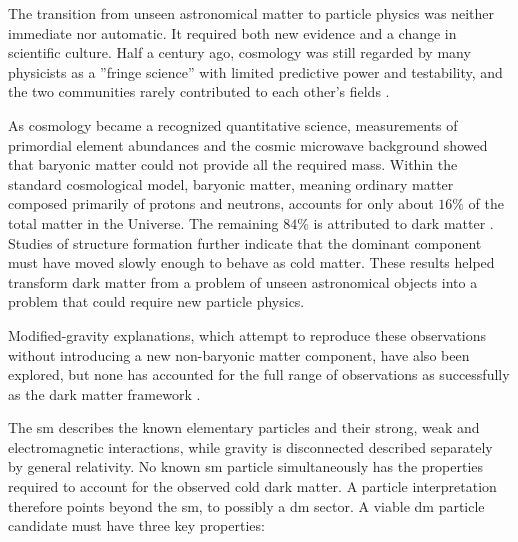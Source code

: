 The transition from unseen astronomical matter to particle physics was neither
immediate nor automatic. It required both new evidence and a change in
scientific culture. Half a century ago, cosmology was still regarded by many physicists as a ''fringe science'' with limited predictive
power and testability, and the two communities rarely contributed to each
other's fields \cite{bertone2016-history-dark-matter}.

As cosmology became a recognized quantitative science, measurements of primordial element
abundances and the cosmic microwave background showed that baryonic
matter could not provide all the required mass. Within the standard
cosmological model, baryonic matter, meaning ordinary matter composed primarily
of protons and neutrons, accounts for only about \(16\%\) of the total matter
in the Universe. The remaining \(84\%\) is attributed to dark matter
\cite{cirelli2026-darkmatter}. Studies of structure formation further indicate
that the dominant component must have moved slowly enough to behave as cold matter. These results helped transform dark matter from a problem of unseen
astronomical objects into a problem that could require new particle physics.

Modified-gravity explanations, which attempt to reproduce these observations
without introducing a new non-baryonic matter component, have also been
explored, but none has accounted for the full range of observations as
successfully as the dark matter framework
\cite{bertone2016-history-dark-matter,cirelli2026-darkmatter}. 

The \gls{sm} describes the known elementary particles and their strong, weak
and electromagnetic interactions, while gravity is disconnected described separately by
general relativity. No known \gls{sm} particle simultaneously has the
properties required to account for the observed cold dark matter. A particle
interpretation therefore points beyond the \gls{sm}, to possibly a \gls{dm} sector. 
A viable \gls{dm} particle
candidate must have three key properties:




